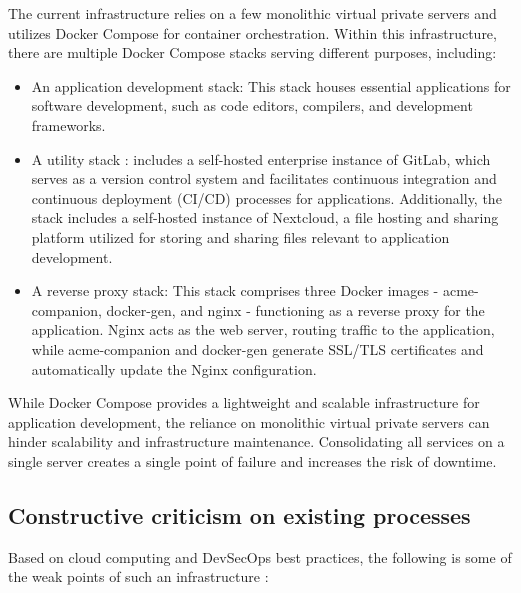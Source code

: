 \hspace{7mm}The current infrastructure relies on a few monolithic virtual private servers and utilizes Docker Compose for container orchestration. Within this infrastructure, there are multiple Docker Compose stacks serving different purposes, including: 
\begin{itemize}[label={--}]
\item An application development stack: This stack houses essential applications for software development, such as code editors, compilers, and development frameworks. 

\item A utility stack : includes a self-hosted enterprise instance of GitLab, which serves as a version control system and facilitates continuous integration and continuous deployment (CI/CD) processes for applications. Additionally, the stack includes a self-hosted instance of Nextcloud, a file hosting and sharing platform utilized for storing and sharing files relevant to application development. 

\item A reverse proxy stack: This stack comprises three Docker images - acme-companion, docker-gen, and nginx - functioning as a reverse proxy for the application. Nginx acts as the web server, routing traffic to the application, while acme-companion and docker-gen generate SSL/TLS certificates and automatically update the Nginx configuration. 
\end{itemize}

\hspace{7mm}While Docker Compose provides a lightweight and scalable infrastructure for application development, the reliance on monolithic virtual private servers can hinder scalability and infrastructure maintenance. Consolidating all services on a single server creates a single point of failure and increases the risk of downtime. 

\subsection{Constructive criticism on existing processes} 

\hspace{7mm}Based on cloud computing and DevSecOps best practices, the following is some of the weak points of such an infrastructure :

